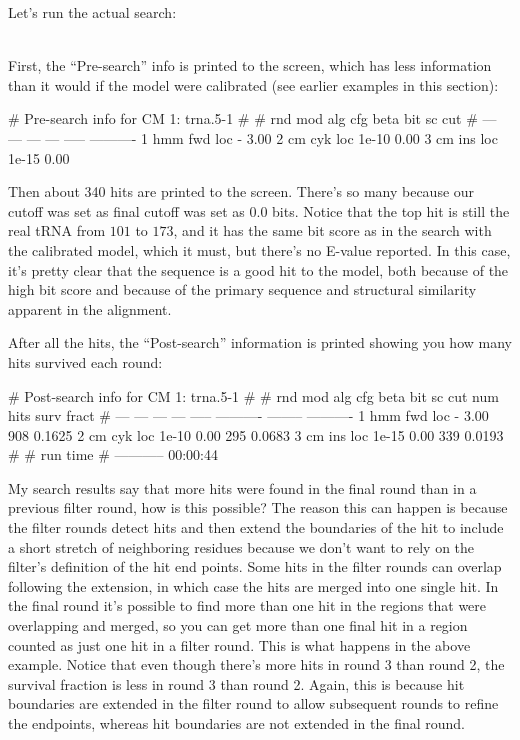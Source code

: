 Let's run the actual search:

\\

First, the ``Pre-search'' info is printed to the screen, which has
less information than it would if the model were calibrated (see
earlier examples in this section): 

\begin{sreoutput}
# Pre-search info for CM 1: trna.5-1
#
# rnd  mod  alg  cfg   beta  bit sc cut
# ---  ---  ---  ---  -----  ----------
    1  hmm  fwd  loc      -        3.00
    2   cm  cyk  loc  1e-10        0.00
    3   cm  ins  loc  1e-15        0.00
\end{sreoutput}

Then about 340 hits are printed to the screen. There's so many because
our cutoff was set as final cutoff was set as $0.0$ bits. Notice that 
the top hit is still the real tRNA from $101$ to $173$, and it 
has the same bit score as in the search with the calibrated model,
which it must, but there's no E-value reported. In this case, it's
pretty clear that the sequence is a good hit to the model, both
because of the high bit score and because of the primary sequence and
structural similarity apparent in the  alignment. 

After all the hits, the ``Post-search'' information is printed showing
you how many hits survived each round:

\begin{sreoutput}
# Post-search info for CM 1: trna.5-1
#
# rnd  mod  alg  cfg   beta  bit sc cut  num hits  surv fract
# ---  ---  ---  ---  -----  ----------  --------  ----------
    1  hmm  fwd  loc      -        3.00       908      0.1625
    2   cm  cyk  loc  1e-10        0.00       295      0.0683
    3   cm  ins  loc  1e-15        0.00       339      0.0193
#
#    run time
# -----------
     00:00:44
\end{sreoutput}

\begin{srefaq}{My search results say that more hits were found in the
final round than in a previous filter round, how is this possible?}
The reason this can happen is because the filter
rounds detect hits and then extend the boundaries of the hit to
include a short stretch of neighboring residues because
we don't want to rely on the filter's definition of the hit end
points. Some hits in the filter rounds can overlap following the
extension, in which case the hits are merged into one single hit. In the
final round it's possible to find more than one hit in the regions that
were overlapping and merged, so you can get more than one final hit in a
region counted as just one hit in a filter round. This is what happens
in the above example. Notice that even though there's more hits in
round 3 than round 2, the survival fraction is less in round 3 than
round 2. Again, this is because hit boundaries are extended in the
filter round to allow subsequent rounds to refine the endpoints,
whereas hit boundaries are not extended in the final round.
\end{srefaq}

